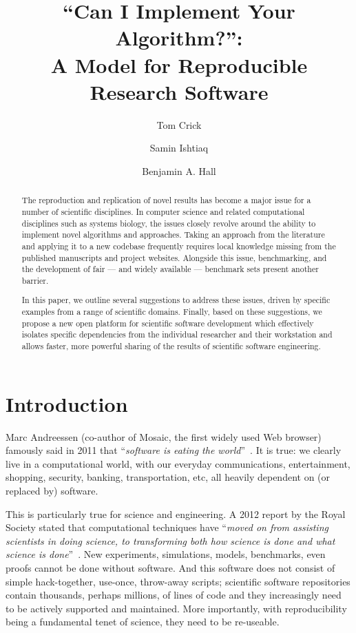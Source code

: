 \documentclass[a4paper,11pt]{article}
\title{``Can I Implement Your Algorithm?'':\\A Model for Reproducible Research Software}
\author[1]{Tom Crick}
\author[2]{Samin Ishtiaq}
\author[3]{Benjamin A. Hall}
\affil[1]{Department of Computing \& Information Systems, Cardiff
  Metropolitan University, UK}
\affil[2]{Microsoft Research Cambridge, UK}
\affil[3]{MRC Cancer Unit, University of Cambridge, UK}
\affil[1]{\protect\url{tcrick@cardiffmet.ac.uk}}
\affil[2]{\protect\url{samin.ishtiaq@microsoft.com}}
\affil[3]{\protect\url{bh418@mrc-cu.cam.ac.uk}}
\date{ }
\begin{document}
\maketitle

\begin{abstract}
The reproduction and replication of novel results has become a major
issue for a number of scientific disciplines. In computer science and
related computational disciplines such as systems biology, the issues
closely revolve around the ability to implement novel algorithms and
approaches. Taking an approach from the literature and applying it to
a new codebase frequently requires local knowledge missing from the
published manuscripts and project websites. Alongside this issue,
benchmarking, and the development of fair --- and widely available ---
benchmark sets present another barrier.

In this paper, we outline several suggestions to address these issues,
driven by specific examples from a range of scientific domains.
Finally, based on these suggestions, we propose a new open platform
for scientific software development which effectively isolates
specific dependencies from the individual researcher and their
workstation and allows faster, more powerful sharing of the results of
scientific software engineering.
\end{abstract}

\section{Introduction}

Marc Andreessen (co-author of Mosaic, the first widely used Web
browser) famously said in 2011 that ``{\emph{software is eating the
world}}''~\cite{andreessen:2011}. It is true: we clearly live in a
computational world, with our everyday communications, entertainment,
shopping, security, banking, transportation, etc, all heavily
dependent on (or replaced by) software.

This is particularly true for science and engineering. A 2012 report
by the Royal Society stated that computational techniques have
``{\emph{moved on from assisting scientists in doing science, to
transforming both how science is done and what science is
done}}''~\cite{rssaaoe:2012}. New experiments, simulations, models,
benchmarks, even proofs cannot be done without software. And this
software does not consist of simple hack-together, use-once,
throw-away scripts; scientific software repositories contain
thousands, perhaps millions, of lines of code and they increasingly
need to be actively supported and maintained. More importantly, with
reproducibility being a fundamental tenet of science, they need to be
re-useable.
\end{document}
